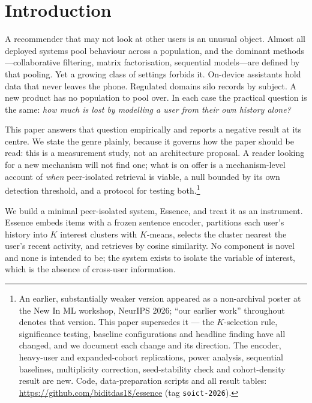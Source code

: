 \documentclass[runningheads,a4paper]{llncs}
\begin{document}
\section{Introduction}

A recommender that may not look at other users is an unusual object. Almost all deployed
systems pool behaviour across a population, and the dominant methods---collaborative
filtering, matrix factorisation, sequential models---are defined by that pooling. Yet a
growing class of settings forbids it. On-device assistants hold data that never leaves the
phone. Regulated domains silo records by subject. A new product has no population to pool
over. In each case the practical question is the same: \emph{how much is lost by modelling
a user from their own history alone?}

This paper answers that question empirically and reports a negative result at its
centre. We state the genre plainly, because it governs how the paper should be read: this is a
measurement study, not an architecture proposal. A reader looking for a new mechanism will
not find one; what is on offer is a mechanism-level account of \emph{when} peer-isolated
retrieval is viable, a null bounded by its own detection threshold, and a protocol for
testing both.\footnote{An earlier, substantially weaker version appeared as a non-archival poster at the
New In ML workshop, NeurIPS 2026; ``our earlier work'' throughout denotes that version. This
paper supersedes it --- the $K$-selection rule, significance testing, baseline
configurations and headline finding have all changed, and we document each change and its
direction. The encoder, heavy-user and expanded-cohort replications, power analysis,
sequential baselines, multiplicity correction, seed-stability check and cohort-density
result are new. Code, data-preparation scripts and all result tables:
\url{https://github.com/biditdas18/essence} (tag \texttt{soict-2026}).}

We build a minimal peer-isolated system, Essence, and treat it as an instrument. Essence
embeds items with a frozen sentence encoder, partitions each user's history into $K$
interest clusters with $K$-means, selects the cluster nearest the user's recent activity,
and retrieves by cosine similarity. No component is novel and none is intended to be; the
system exists to isolate the variable of interest, which is the absence of cross-user
information.
\end{document}
